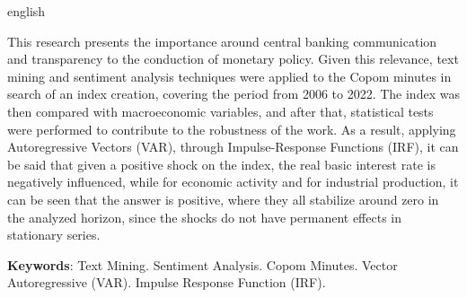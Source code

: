\begin{resumo}[Abstract]
 \begin{otherlanguage*}{english}

This research presents the importance around central banking communication and transparency to the conduction of monetary policy. Given this relevance, text mining and sentiment analysis techniques were applied to the Copom minutes in search of an index creation, covering the period from 2006 to 2022. The index was then compared with macroeconomic variables, and after that, statistical tests were performed to contribute to the robustness of the work. As a result, applying Autoregressive Vectors (VAR), through Impulse-Response Functions (IRF), it can be said that given a positive shock on the index, the real basic interest rate is negatively influenced, while for economic activity and for industrial production, it can be seen that the answer is positive, where they all stabilize around zero in the analyzed horizon, since the shocks do not have permanent effects in stationary series.

\textbf{Keywords}: Text Mining. Sentiment Analysis. Copom Minutes. Vector Autoregressive (VAR). Impulse Response Function (IRF).
 \end{otherlanguage*}
\end{resumo}

